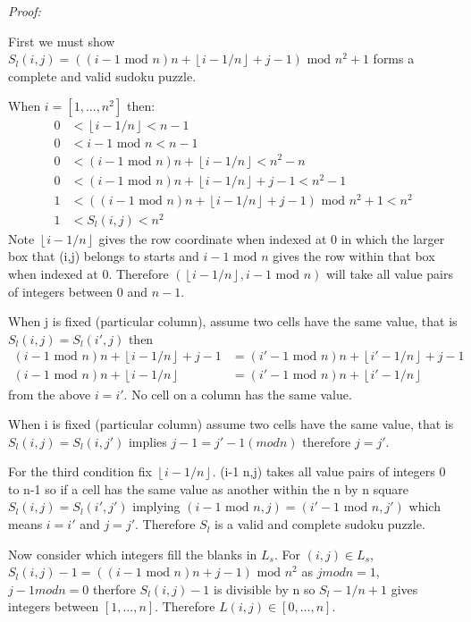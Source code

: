 \documentclass[a4paper,12pt]{article}
\begin{document}
\textit{Proof:}

First we must show $S_l(i,j)=((i-1 \text{ mod } n)n + \left\lfloor{i-1/n}\right\rfloor+j-1)\text{ mod } n^2 +1$ forms a complete and valid sudoku puzzle.

When $i=[1,...,n^2]$ then:
\begin{align}
	0&<\left\lfloor{i-1/n}\right\rfloor<n-1\\
	0&<i-1 \text{ mod } n<n-1\\
	0&<(i-1 \text{ mod } n)n + \left\lfloor{i-1/n}\right\rfloor<n^2-n\\
	0&<(i-1 \text{ mod } n)n + \left\lfloor{i-1/n}\right\rfloor+j-1<n^2-1\\
	1&<((i-1 \text{ mod } n)n + \left\lfloor{i-1/n}\right\rfloor+j-1)\text{ mod } n^2 +1<n^2\\
	1&<S_l(i,j)<n^2
\end{align} 
Note $\left\lfloor{i-1/n}\right\rfloor$ gives the row coordinate when indexed at 0 in which the larger box that (i,j) belongs to starts and $i-1 \text{ mod } n$ gives the row within that box when indexed at 0. Therefore $(\left\lfloor{i-1/n}\right\rfloor,i-1 \text{ mod } n)$ will take all value pairs of integers between 0 and $n-1$.

When j is fixed (particular column), assume two cells have the same value, that is $S_l(i,j)=S_l(i',j)$ then
\begin{align}
	(i-1 \text{ mod } n)n + \left\lfloor{i-1/n}\right\rfloor+j-1 &= (i'-1 \text{ mod } n)n + \left\lfloor{i'-1/n}\right\rfloor+j-1\\
	(i-1 \text{ mod } n)n + \left\lfloor{i-1/n}\right\rfloor &= (i'-1 \text{ mod } n)n + \left\lfloor{i'-1/n}\right\rfloor
\end{align}
from the above $i=i'$. No cell on a column has the same value.

When i is fixed (particular column) assume two cells have the same value, that is $S_l(i,j)=S_l(i,j')$ implies $j-1=j'-1 (mod n)$ therefore $j=j'$.

For the third condition fix $\left\lfloor{i-1/n}\right\rfloor$. (i-1  n,j) takes all value pairs of integers 0 to n-1 so if a cell has the same value as another within the n by n square $S_l(i,j)=S_l(i',j')$ implying $(i-1 \text{ mod } n,j)=(i'-1 \text{ mod } n,j')$ which means $i=i'$ and $j=j'$. Therefore $S_l$ is a valid and complete sudoku puzzle.

Now consider which integers fill the blanks in $L_s$. For $(i,j)\in L_s$, $S_l(i,j)-1= ((i-1 \text{ mod } n)n+j-1)\text{ mod } n^2$ as $j mod n=1$, $j-1modn=0$ therfore $S_l(i,j)-1$ is divisible by n so $S_l-1/n+1$ gives integers between $[1,...,n]$. Therefore $L(i,j) \in [0,...,n]$.
\end{document}

